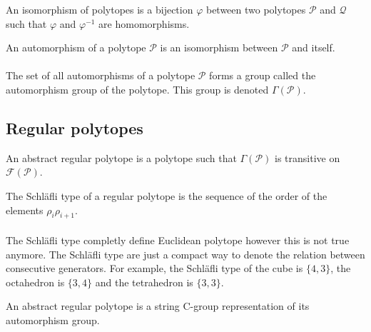 \begin{definition}
  An isomorphism of polytopes is a bijection $\varphi$ between two polytopes $\mathcal P$ and $\mathcal Q$ such that $\varphi$ and $\varphi^{-1}$ are homomorphisms.
\end{definition}

\begin{definition}
  An automorphism of a polytope $\mathcal P$ is an isomorphism between $\mathcal P$ and itself.
\end{definition}

\paragraph{}
The set of all automorphisms of a polytope $\mathcal P$ forms a group called the automorphism group of the polytope. This group is denoted $\Gamma(\mathcal P)$.

\subsection{Regular polytopes}

\begin{definition}
  An abstract regular polytope is a polytope such that $\Gamma(\mathcal P)$ is transitive on $\mathcal F(\mathcal P)$.
\end{definition}

\begin{definition}
  The Schläfli type of a regular polytope is the sequence of the order of the elements $\rho_i \rho_{i+1}$.
\end{definition}

\paragraph{}
The Schläfli type completly define Euclidean polytope however this is not true anymore. The Schläfli type are just a compact way to denote the relation between consecutive generators. For example, the Schläfli type of the cube is $\{4,3\}$, the octahedron is $\{3,4\}$ and the tetrahedron is $\{3,3\}$.

\begin{theorem}
  An abstract regular polytope is a string C-group representation of its automorphism group.
\end{theorem}

